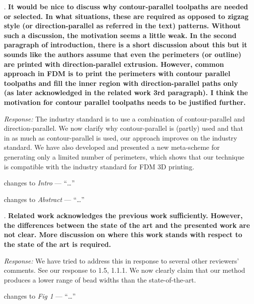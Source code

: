 \documentclass[5p,twocolumn,10pt,times]{elsarticle}
\theoremstyle{definition}
\newcommand{\stkout}[1]{\ifmmode\text{\sout{\ensuremath{#1}}}\else\sout{#1}\fi}
\newcommand{\revise}[2]{\noindent{\color{red}{\stkout{#1}}}\noindent{\color{blue}{#2}}}
\newcommand{\todo}[1]{\par\noindent{\bf \color{orange}#1}}
\newcommand{\commits}[1]{{\bf\begin{alltt} {#1}\end{alltt}}}
\renewcommand{\commits}[1]{}
\newcommand\paper[2]{\par changes to \emph{#1} --- ``#2'' }
\renewcommand\paper[2]{\par changes to \emph{#1} --- ``\dots'' }
\newcommand\Que[1]{%
   \leavevmode\par
   \stepcounter{question}
   \noindent
   \thequestion. {\bf#1}\par}
\newcounter{question}
\numberwithin{question}{section}
\newcommand\Ans[2][]{%
    \leavevmode\par\noindent
   {%
    {\it Response:} \textbf{#1}#2\par}}
\begin{document}
\Que{
It would be nice to discuss why contour-parallel toolpaths are needed or selected. In what situations, these are required as opposed to zigzag style (or direction-parallel as referred in the text) patterns. Without such a discussion, the motivation seems a little weak. In the second paragraph of introduction, there is a short discussion about this but it sounds like the authors assume that even the perimeters (or outline) are printed with direction-parallel extrusion. However, common approach in FDM is to print the perimeters with contour parallel toolpaths and fill the inner region with direction-parallel paths only (as later acknowledged in the related work 3rd paragraph). I think the motivation for contour parallel toolpaths needs to be justified further. 
}
\Ans{
The industry standard is to use a combination of contour-parallel and direction-parallel.
We now clarify why contour-parallel is (partly) used and that in as much as contour-parallel is used, our approach improves on the industry standard.
We have also developed and presented a new meta-scheme for generating only a limited number of perimeters, which shows that our technique is compatible with the industry standard for FDM 3D printing.
}

\commits{6b0f8c78d31bd0c6946885da96f73f1cfc1a21ae ac800628951417dcb28bd6e3a0ed08801735acf4 a88ccd3309aef1233ed00ce9f22b244fe64668f4 077c8ee138bb311a8ba9abf303af4b09e973637a}
\paper{Intro}{
\revise{
Contour-parallel extrusion therefore leads to a less bumpy outline shape than direction-parallel extrusion does.
}{
Because contour-parallel extrusion leads to a more accurate outline shape it is common practice to print either the whole layer or only a limited number of outer perimeters that way.
This paper improves on those contour-parallel toolpaths and addresses several issues which commonly occur in 3D models with narrow geometry.
}
}
\paper{Abstract}{
\revise{By densely filling consecutive 2D layers with contour-parallel extrusion toolpaths, FDM can produce parts with high stiffness and strength.}
{High stiffness parts are produced by filling the 2D polygons of consecutive layers (partly) with contour-parallel extrusion toolpaths.}
}




\Que{
Related work acknowledges the previous work sufficiently. However, the differences between the state of the art and the presented work are not clear. More discussion on where this work stands with respect to the state of the art is required. 
}
\Ans{
We have tried to address this in response to several other reviewers' comments.
See our response to 1.5, 1.1.1.
We now clearly claim that our method produces a lower range of bead widths than the state-of-the-art.
}
\todo{link with other responses}
\commits{004894210fbc961f82b792fc702d1b67a1a8e8e8}
\paper{Fig 1}{
\subref{intro_wedge_distributed} Our approach minimizes over- and underfill with \revise{beads close to the nozzle size}{less extreme widths}.
}
\end{document}

